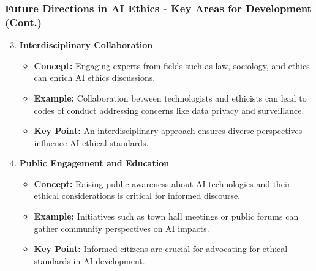 \documentclass[aspectratio=169]{beamer}
\begin{document}
\begin{frame}[fragile]
    \frametitle{Future Directions in AI Ethics - Key Areas for Development (Cont.)}
    \begin{enumerate}
        \setcounter{enumi}{2}
        \item \textbf{Interdisciplinary Collaboration}
            \begin{itemize}
                \item \textbf{Concept:} Engaging experts from fields such as law, sociology, and ethics can enrich AI ethics discussions.
                \item \textbf{Example:} Collaboration between technologists and ethicists can lead to codes of conduct addressing concerns like data privacy and surveillance.
                \item \textbf{Key Point:} An interdisciplinary approach ensures diverse perspectives influence AI ethical standards.
            \end{itemize}
    
        \item \textbf{Public Engagement and Education}
            \begin{itemize}
                \item \textbf{Concept:} Raising public awareness about AI technologies and their ethical considerations is critical for informed discourse.
                \item \textbf{Example:} Initiatives such as town hall meetings or public forums can gather community perspectives on AI impacts.
                \item \textbf{Key Point:} Informed citizens are crucial for advocating for ethical standards in AI development.
            \end{itemize}
    \end{enumerate}
\end{frame}
\end{document}
